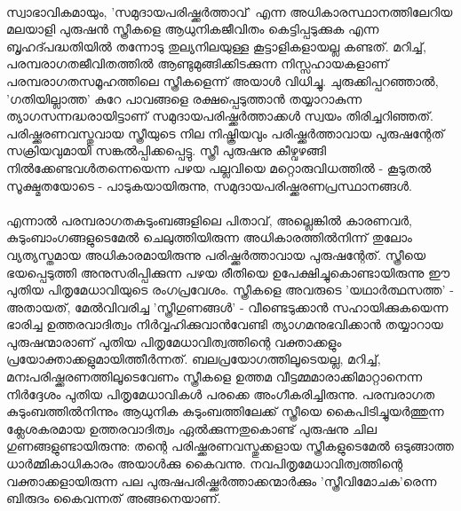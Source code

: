 \paragraph{}സ്വാഭാവികമായും, 'സമുദായപരിഷ്ക്കർത്താവ്' എന്ന അധികാരസ്ഥാനത്തിലേറിയ മലയാളി പുരുഷൻ സ്ത്രീകളെ ആധുനികജീവിതം കെട്ടിപ്പടുക്കുക എന്ന ബൃഹദ്പദ്ധതിയിൽ തന്നോടു തുല്യനിലയുള്ള കൂട്ടാളികളായല്ല കണ്ടത്. മറിച്ച്, പരമ്പരാഗതജീവിതത്തിൽ ആണ്ടുമുങ്ങിക്കിടക്കുന്ന നിസ്സഹായകളാണ് പരമ്പരാഗതസമൂഹത്തിലെ സ്ത്രീകളെന്ന് അയാൾ വിധിച്ചു. ചുരുക്കിപ്പറഞ്ഞാൽ, 'ഗതിയില്ലാത്ത' കുറേ പാവങ്ങളെ രക്ഷപ്പെടുത്താൻ തയ്യാറാകുന്ന ത്യാഗസന്നദ്ധരായിട്ടാണ് സമുദായപരിഷ്ക്കർത്താക്കൾ സ്വയം തിരിച്ചറിഞ്ഞത്. പരിഷ്ക്കരണവസ്തുവായ സ്ത്രീയുടെ നില നിഷ്ക്രിയവും പരിഷ്ക്കർത്താവായ പുരുഷന്റേത് സക്രിയവുമായി സങ്കൽപ്പിക്കപ്പെട്ടു. സ്ത്രീ പുരുഷനു കീഴ്വഴങ്ങി നിൽക്കേണ്ടവൾതന്നെയെന്ന പഴയ പല്ലവിയെ മറ്റൊരുവിധത്തിൽ - കൂടുതൽ സൂക്ഷ്മതയോടെ - പാടുകയായിരുന്നു, സമുദായപരിഷ്ക്കരണപ്രസ്ഥാനങ്ങൾ.
\paragraph{}എന്നാൽ പരമ്പരാഗതകുടുംബങ്ങളിലെ പിതാവ്, അല്ലെങ്കിൽ കാരണവർ, കുടുംബാംഗങ്ങളുടെമേൽ ചെലുത്തിയിരുന്ന അധികാരത്തിൽനിന്ന് തുലോം വ്യത്യസ്തമായ അധികാരമായിരുന്നു പരിഷ്ക്കർത്താവായ പുരുഷന്റേത്. സ്ത്രീയെ ഭയപ്പെടുത്തി അനുസരിപ്പിക്കുന്ന പഴയ രീതിയെ ഉപേക്ഷിച്ചുകൊണ്ടായിരുന്നു ഈ പുതിയ പിതൃമേധാവിയുടെ രംഗപ്രവേശം. സ്ത്രീകളെ അവരുടെ 'യഥാർത്ഥസത്ത' - അതായത്, മേൽവിവരിച്ച 'സ്ത്രീഗുണങ്ങൾ' - വീണ്ടെടുക്കാൻ സഹായിക്കുകയെന്ന ഭാരിച്ച ഉത്തരവാദിത്വം നിർവ്വഹിക്കുവാൻവേണ്ടി ത്യാഗമനുഭവിക്കാൻ തയ്യാറായ പുരുഷന്മാരാണ് പുതിയ പിതൃമേധാവിത്വത്തിന്റെ വക്താക്കളും പ്രയോക്താക്കളുമായിത്തീർന്നത്. ബലപ്രയോഗത്തിലൂടെയല്ല, മറിച്ച്, മനഃപരിഷ്ക്കരണത്തിലൂടെവേണം സ്ത്രീകളെ ഉത്തമ വീട്ടമ്മമാരാക്കിമാറ്റാനെന്ന നിർദ്ദേശം പുതിയ പിതൃമേധാവികൾ പരക്കെ അംഗീകരിച്ചിരുന്നു. പരമ്പരാഗത കുടുംബത്തിൽനിന്നും ആധുനിക കുടുംബത്തിലേക്ക് സ്ത്രീയെ കൈപിടിച്ചുയർത്തുന്ന ക്ലേശകരമായ ഉത്തരവാദിത്വം ഏൽക്കുന്നതുകൊണ്ട് പുരുഷനു ചില ഗുണങ്ങളുണ്ടായിരുന്നു: തന്റെ പരിഷ്ക്കരണവസ്തുക്കളായ സ്ത്രീകളുടെമേൽ ഒടുങ്ങാത്ത ധാർമ്മികാധികാരം അയാൾക്കു കൈവന്നു. നവപിതൃമേധാവിത്വത്തിന്റെ വക്താക്കളായിരുന്ന പല പുരുഷപരിഷ്ക്കർത്താക്കന്മാർക്കും 'സ്ത്രീവിമോചക'രെന്ന ബിരുദം കൈവന്നത് അങ്ങനെയാണ്.

